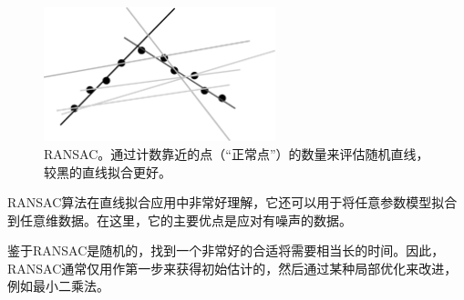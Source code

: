 \begin{figure}
\center
\includegraphics[width=0.6\textwidth]{figs/ransac}
\caption{
RANSAC。通过计数靠近的点（“正常点”）的数量来评估随机直线，较黑的直线拟合更好。
\label{fig:ransac}} 
\end{figure}



RANSAC算法在直线拟合应用中非常好理解，它还可以用于将任意参数模型拟合到任意维数据。在这里，它的主要优点是应对有噪声的数据。

鉴于RANSAC是随机的，找到一个非常好的合适将需要相当长的时间。因此，RANSAC通常仅用作第一步来获得初始估计的，然后通过某种局部优化来改进，例如最小二乘法。


